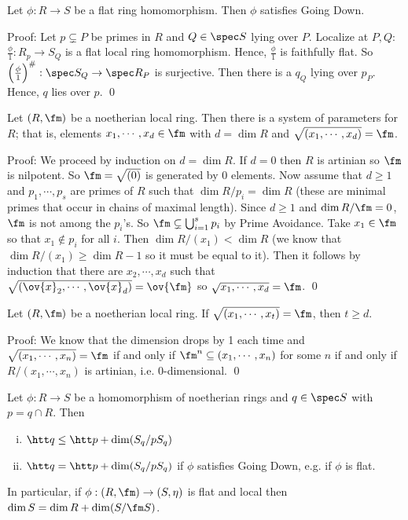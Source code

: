 \begin{prop}
Let $\phi: R \to S$ be a flat ring homomorphism. Then $\phi$ satisfies Going Down.
\end{prop}

\noindent Proof: Let $p \subsetneq P$ be primes in $R$ and $Q \in \spec S$ lying over $P$. Localize at $P,Q$: $\frac{\phi}{1}: R_p \to S_Q$ is a flat local ring homomorphism. Hence, $\frac{\phi}{1}$ is faithfully flat. So $\left(\frac{\phi}{1}\right)^\#: \spec S_Q \to \spec R_P$ is surjective. Then there is a $q_Q$ lying over $p_P$. Hence, $q$ lies over $p$. \qed \\

\begin{lem}
Let $(R,\fm)$ be a noetherian local ring. Then there is a system of parameters for $R$; that is, elements $x_1,\cdots,x_d \in \fm$ with $d=\dim R$ and $\sqrt{(x_1,\cdots,x_d)}=\fm$. 
\end{lem}

\noindent Proof: We proceed by induction on $d=\dim R$. If $d=0$ then $R$ is artinian so $\fm$ is nilpotent. So $\fm=\sqrt{(0)}$ is generated by 0 elements. Now assume that $d \geq 1$ and $p_1,\cdots,p_s$ are primes of $R$ such that $\dim R/p_i=\dim R$ (these are minimal primes that occur in chains of maximal length). Since $d \geq 1$ and $\dim R/\fm=0$, $\fm$ is not among the $p_i$'s. So $\fm \subsetneq \bigcup_{i=1}^s p_i$ by Prime Avoidance. Take $x_1 \in \fm$ so that $x_1 \notin p_i$ for all $i$. Then $\dim R/(x_1) < \dim R$ (we know that $\dim R/(x_1) \geq \dim R-1$ so it must be equal to it). Then it follows by induction that there are $x_2,\cdots,x_d$ such that $\sqrt{(\ov{x}_2,\cdots,\ov{x}_d)}= \ov{\fm}$ so $\sqrt{x_1,\cdots,x_d}=\fm$. \qed \\

\begin{lem}
Let $(R,\fm)$ be a noetherian local ring. If $\sqrt{(x_1,\cdots,x_t)}=\fm$, then $t \geq d$. 
\end{lem}

\noindent Proof: We know that the dimension drops by 1 each time and $\sqrt{(x_1,\cdots,x_n)}=\fm$ if and only if $\fm^n \subseteq (x_1,\cdots,x_n)$ for some $n$ if and only if $R/(x_1,\cdots,x_n)$ is artinian, i.e. 0-dimensional. \qed \\

\begin{thmm}
Let $\phi: R \to S$ be a homomorphism of noetherian rings and $q \in \spec S$ with $p=q \cap R$. Then
\begin{enumerate}[(i)]
\item $\htt q \leq \htt p + \dim(S_q/pS_q)$
\item $\htt q = \htt p + \dim(S_q/pS_q)$ if $\phi$ satisfies Going Down, e.g. if $\phi$ is flat. 
\end{enumerate}
In particular, if $\phi: (R,\fm) \to (S, \eta)$ is flat and local then $\dim S=\dim R+\dim(S/\fm S)$. 
\end{thmm}


